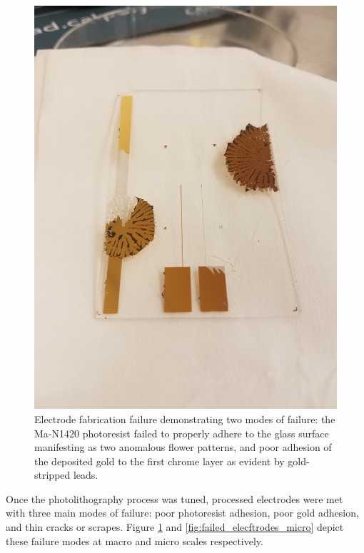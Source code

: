 \begin{figure}[h]
    \centering
    \includegraphics[width=\textwidth]{images/adhesion_issues.jpg}
    \caption{Electrode fabrication failure demonstrating two modes of failure: the Ma-N1420 photoresist failed to properly adhere to the glass surface manifesting as two anomalous flower patterns, and poor adhesion of the deposited gold to the first chrome layer as evident by gold-stripped leads.}
    \label{fig:failed_electrode_macro}
\end{figure}

\par Once the photolithography process was tuned, processed electrodes were met with three main modes of failure: poor photoresist adhesion, poor gold adhesion, and thin cracks or scrapes. Figure \ref{fig:failed_electrode_macro} and \ref{fig:failed_elecftrodes_micro}  depict these failure modes at macro and micro scales respectively.

